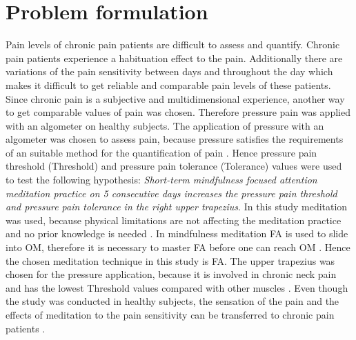\chapter{Problem formulation}

Pain levels of chronic pain patients are difficult to assess and quantify. Chronic pain patients experience a habituation effect to the pain. Additionally there are variations of the pain sensitivity between days and throughout the day which makes it difficult to get reliable and comparable pain levels of these patients. Since chronic pain is a subjective and multidimensional experience, another way to get comparable values of pain was chosen. Therefore pressure pain was applied with an algometer on healthy subjects. The application of pressure with an algometer was chosen to assess pain, because pressure satisfies the requirements of an suitable method for the quantification of pain \cite{Keele1954}. Hence pressure pain threshold (Threshold) and pressure pain tolerance (Tolerance) values were used to test the following hypothesis:
\textit{Short-term mindfulness focused attention meditation practice on 5 consecutive days increases the pressure pain threshold and pressure pain tolerance in the right upper trapezius}. In this study meditation was used, because physical limitations are not affecting the meditation practice and no prior knowledge is needed \cite{Tang2017}. In mindfulness meditation FA is used to slide into OM, therefore it is necessary to master FA before one can reach OM \cite{Zeidan2016, Kabat1982, Perlman2010}. Hence the chosen meditation technique in this study is FA. The upper trapezius was chosen for the pressure application, because it is involved in chronic neck pain and has the lowest Threshold values compared with other muscles \cite{Falla2004,Fischer1987}. Even though the study was conducted in healthy subjects, the sensation of the pain and the effects of meditation to the pain sensitivity can be transferred to chronic pain patients \cite{Kjogx2016}.



